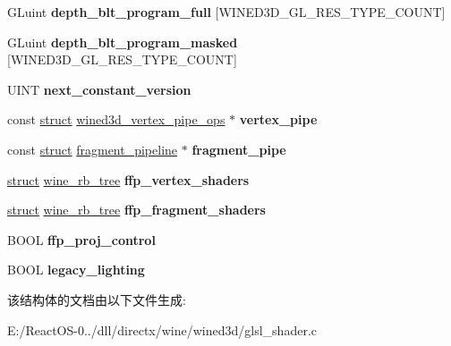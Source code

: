 \begin{DoxyCompactItemize}
G\+Luint {\bfseries depth\+\_\+blt\+\_\+program\+\_\+full} \mbox{[}W\+I\+N\+E\+D3\+D\+\_\+\+G\+L\+\_\+\+R\+E\+S\+\_\+\+T\+Y\+P\+E\+\_\+\+C\+O\+U\+NT\mbox{]}
\item 
\mbox{\label{structshader__glsl__priv_a9bf5415573910fbde73c296f99954b66}} 
G\+Luint {\bfseries depth\+\_\+blt\+\_\+program\+\_\+masked} \mbox{[}W\+I\+N\+E\+D3\+D\+\_\+\+G\+L\+\_\+\+R\+E\+S\+\_\+\+T\+Y\+P\+E\+\_\+\+C\+O\+U\+NT\mbox{]}
\item 
\mbox{\label{structshader__glsl__priv_ab508502a62a41eb6c9015fe9a9f47587}} 
U\+I\+NT {\bfseries next\+\_\+constant\+\_\+version}
\item 
\mbox{\label{structshader__glsl__priv_aefbd0727b50b8a270e00ae7283e87609}} 
const \hyperlink{interfacestruct}{struct} \hyperlink{structwined3d__vertex__pipe__ops}{wined3d\+\_\+vertex\+\_\+pipe\+\_\+ops} $\ast$ {\bfseries vertex\+\_\+pipe}
\item 
\mbox{\label{structshader__glsl__priv_ac53766a61ce84c9388236504c258e5e7}} 
const \hyperlink{interfacestruct}{struct} \hyperlink{structfragment__pipeline}{fragment\+\_\+pipeline} $\ast$ {\bfseries fragment\+\_\+pipe}
\item 
\mbox{\label{structshader__glsl__priv_a8bb9ce7e419fe4ff43f4df494bd5a16e}} 
\hyperlink{interfacestruct}{struct} \hyperlink{structwine__rb__tree}{wine\+\_\+rb\+\_\+tree} {\bfseries ffp\+\_\+vertex\+\_\+shaders}
\item 
\mbox{\label{structshader__glsl__priv_abb51a6765042ba96882a6773223f2648}} 
\hyperlink{interfacestruct}{struct} \hyperlink{structwine__rb__tree}{wine\+\_\+rb\+\_\+tree} {\bfseries ffp\+\_\+fragment\+\_\+shaders}
\item 
\mbox{\label{structshader__glsl__priv_a6f4a6212e6508016d536b4ec57cb196c}} 
B\+O\+OL {\bfseries ffp\+\_\+proj\+\_\+control}
\item 
\mbox{\label{structshader__glsl__priv_af3e38f991516a1e88fffa4b4fb82a476}} 
B\+O\+OL {\bfseries legacy\+\_\+lighting}
\end{DoxyCompactItemize}


该结构体的文档由以下文件生成\+:\begin{DoxyCompactItemize}
\item 
E\+:/\+React\+O\+S-\/0../dll/directx/wine/wined3d/glsl\+\_\+shader.\+c\end{DoxyCompactItemize}
